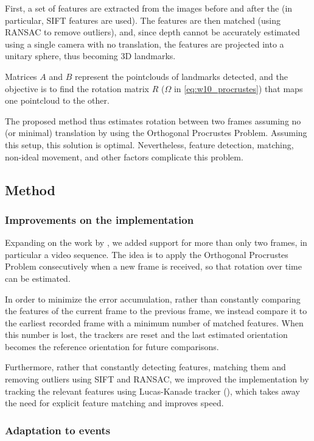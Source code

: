 \documentclass[10pt,twocolumn]{IEEEtran}
\begin{document}
First, a set of features are extracted from the images before and after the (in particular, SIFT features are used). The features are then matched (using RANSAC to remove outliers), and, since depth cannot be accurately estimated using a single camera with no translation, the features are projected into a unitary sphere, thus becoming 3D landmarks. 

Matrices $A$ and $B$ represent the pointclouds of landmarks detected, and the objective is to find the rotation matrix $R$ ($\Omega$ in \eqref{eq:w10_procrustes}) that maps one pointcloud to the other. 

The proposed method thus estimates rotation between two frames assuming no (or minimal) translation by using the Orthogonal Procrustes Problem. Assuming this setup, this solution is optimal. Nevertheless, feature detection, matching, non-ideal movement, and other factors complicate this problem.  

\subsection{Method}

\subsubsection{Improvements on the implementation}

Expanding on the work by \cite{mariana2019}, we added support for more than only two frames, in particular a video sequence. The idea is to apply the Orthogonal Procrustes Problem consecutively when a new frame is received, so that rotation over time can be estimated.

In order to minimize the error accumulation, rather than constantly comparing the features of the current frame to the previous frame, we instead compare it to the earliest recorded frame with a minimum number of matched features. When this number is lost, the trackers are reset and the last estimated orientation becomes the reference orientation for future comparisons.

Furthermore, rather that constantly detecting features, matching them and removing outliers using SIFT and RANSAC, we improved the implementation by tracking the relevant features using Lucas-Kanade tracker (\cite{lucas1981iterative}), which takes away the need for explicit feature matching and improves speed.

\subsubsection{Adaptation to events}
\end{document}
